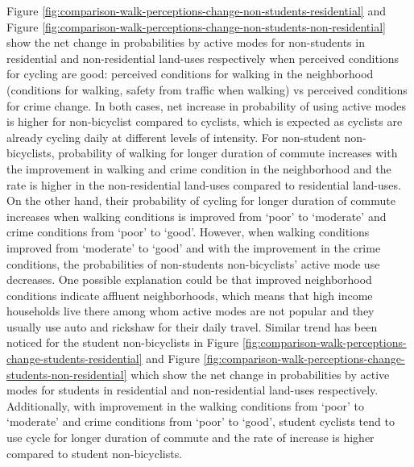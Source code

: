 \documentclass[]{elsarticle} %
\begin{document}
Figure
\ref{fig:comparison-walk-perceptions-change-non-students-residential}
and Figure
\ref{fig:comparison-walk-perceptions-change-non-students-non-residential}
show the net change in probabilities by active modes for non-students in
residential and non-residential land-uses respectively when perceived
conditions for cycling are good: perceived conditions for walking in the
neighborhood (conditions for walking, safety from traffic when walking)
vs perceived conditions for crime change. In both cases, net increase in
probability of using active modes is higher for non-bicyclist compared
to cyclists, which is expected as cyclists are already cycling daily at
different levels of intensity. For non-student non-bicyclists,
probability of walking for longer duration of commute increases with the
improvement in walking and crime condition in the neighborhood and the
rate is higher in the non-residential land-uses compared to residential
land-uses. On the other hand, their probability of cycling for longer
duration of commute increases when walking conditions is improved from
`poor' to `moderate' and crime conditions from `poor' to `good'.
However, when walking conditions improved from `moderate' to `good' and
with the improvement in the crime conditions, the probabilities of
non-students non-bicyclists' active mode use decreases. One possible
explanation could be that improved neighborhood conditions indicate
affluent neighborhoods, which means that high income households live
there among whom active modes are not popular and they usually use auto
and rickshaw for their daily travel. Similar trend has been noticed for
the student non-bicyclists in Figure
\ref{fig:comparison-walk-perceptions-change-students-residential} and
Figure
\ref{fig:comparison-walk-perceptions-change-students-non-residential}
which show the net change in probabilities by active modes for students
in residential and non-residential land-uses respectively. Additionally,
with improvement in the walking conditions from `poor' to `moderate' and
crime conditions from `poor' to `good', student cyclists tend to use
cycle for longer duration of commute and the rate of increase is higher
compared to student non-bicyclists.
\end{document}
